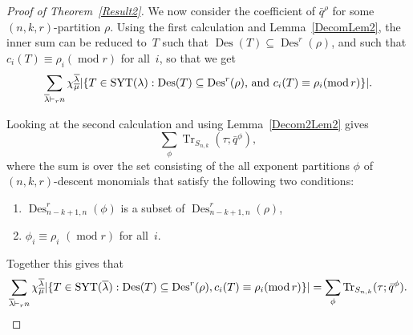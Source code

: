 \documentclass[10pt]{article}
\newcommand{\modrm}{\operatorname{mod}}\newcommand{\Des}{\operatorname{Des}}\newcommand{\des}{\operatorname{des}}
\newcommand{\Tr}{\operatorname{Tr}}\newcommand{\rev}{\operatorname{rev}}
\begin{document}
\begin{proof}[Proof of Theorem~\ref{Result2}]
		We now consider the coefficient of $\bar{q}^\rho$ for some $(n,k,r)$-partition $\rho$. Using the first calculation and 
Lemma~\ref{DecomLem2}, the inner sum can be reduced to~$T$ such that $\Des (T)\subseteq \Des ^r(\rho)$, and such that 
$c_i(T)\equiv \rho_i (\modrm r)$ for all~$i$, so that we get
\begin{equation}
\sum_{\overline{\lambda}\vdash_r n} 
\chi^{\overline{\lambda}}_{\overline{\mu}}\vert \{T\in \SYT (\lambda): \Des (T)\subseteq \Des ^r(\rho)\text{, and } 
c_i(T)\equiv \rho_i (\modrm r)\}\vert.
\end{equation}

Looking at the second calculation and using Lemma~\ref{Decom2Lem2} gives
\begin{equation}
\sum_{\phi} 
\Tr _{S_{n,k}}(\tau;\bar{q}^{\phi}),
\end{equation}
where the sum is over the set consisting of the all exponent partitions $\phi$ 
of $(n,k,r)$-descent monomials that satisfy the following two conditions:

	\begin{enumerate}

	\item $\Des ^r_{n-k+1,n}(\phi)$ is a subset of $\Des ^r_{n-k+1,n}(\rho)$,
	
	\item $\phi_i\equiv \rho_i$ $(\modrm r)$ for all~$i$.
	
	
	\end{enumerate}

Together this gives that
\begin{equation}
\sum_{\overline{\lambda}\vdash_r n} \chi^{\overline{\lambda}}_{\overline{\mu}}\vert 
\{T\in \SYT (\overline{\lambda}): \Des (T)\subseteq \Des ^r(\rho), c_i(T)\equiv \rho_i (\modrm r)\}\vert=\sum_{\phi} 
\Tr _{S_{n,k}}(\tau;\bar{q}^{\phi}).
\end{equation}


\end{proof}
\end{document}
